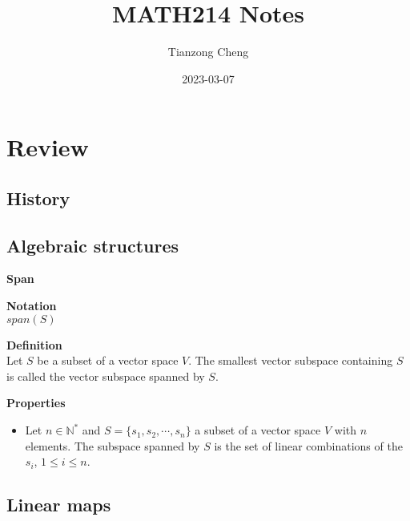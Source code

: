 \documentclass{article}
\title{MATH214 Notes}
\author{Tianzong Cheng}
\date{2023-03-07}
\begin{document}
\maketitle

\section{Review}

\subsection{History}

\subsection{Algebraic structures}

\begin{framed}

    \textbf{Span}

    \begin{framed}
        \textbf{Notation}\\
        $span(S)$
    \end{framed}

    \begin{framed}
        \textbf{Definition}\\
        Let $S$ be a subset of a vector space $V$. The smallest vector subspace containing $S$ is called the vector subspace spanned by $S$.
    \end{framed}

    \begin{framed}
        \textbf{Properties}
        \begin{itemize}
            \item Let $n\in \mathbb{N}^{*}$ and $S=\{ s_{1},s_{2},\cdots,s_{n}\}$ a subset of a vector space $V$ with $n$ elements. The subspace spanned by $S$ is the set of linear combinations of the $s_{i}$, $1\leq i\leq n$.
        \end{itemize}
    \end{framed}

\end{framed}

\newpage

\subsection{Linear maps}
\end{document}
